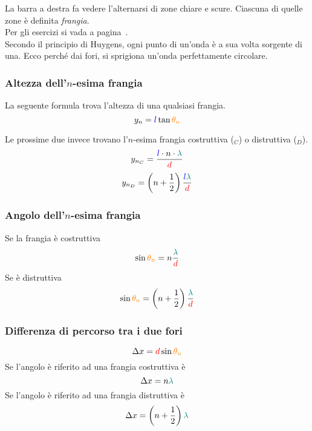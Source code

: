 La barra a destra fa vedere l'alternarsi di zone chiare e scure. Ciascuna di quelle zone è definita
\emph{frangia}.\\
Per gli esercizi si vada a pagina~\pageref{ex:young}.\\ [\baselineskip]
Secondo il principio di Huygens, ogni punto di un'onda è a sua volta sorgente di una. Ecco perché
dai fori, si sprigiona un'onda perfettamente circolare.

\subsubsection{Altezza dell'$n$-esima frangia}
La seguente formula trova l'altezza di una qualsiasi frangia.
\begin{equation*}
  y_n = \mathcolor{blue}{l}\tan\mathcolor{orange}{\theta_n}
\end{equation*}

Le prossime due invece trovano l'$n$-esima frangia costruttiva ($_C$) o distruttiva ($_D$).
\begin{equation*}
  y_{n_C} = \frac{\mathcolor{blue}{l}\cdot n\cdot\mathcolor{teal}{\lambda}}{\mathcolor{red}{d}}
\end{equation*}
\begin{equation*}
  y_{n_D} =
  \left(n+\frac{1}{2}\right)\frac{\mathcolor{blue}{l}\mathcolor{teal}{\lambda}}{\mathcolor{red}{d}}
\end{equation*}

\subsubsection{Angolo dell'$n$-esima frangia}
Se la frangia è costruttiva
\begin{equation*}
  \sin\mathcolor{orange}{\theta_n} = n\frac{\mathcolor{teal}{\lambda}}{\mathcolor{red}{d}}
\end{equation*}
Se è distruttiva
\begin{equation*}
  \sin\mathcolor{orange}{\theta_n} =
  \left(n+\frac{1}{2}\right)\frac{\mathcolor{teal}{\lambda}}{\mathcolor{red}{d}}
\end{equation*}

\subsubsection{Differenza di percorso tra i due fori}
\begin{equation*}
  \Delta x = \mathcolor{red}{d}\sin\mathcolor{orange}{\theta_n}
\end{equation*}
Se l'angolo è riferito ad una frangia costruttiva è 
\begin{equation*}
  \Delta x = n\mathcolor{teal}{\lambda}
\end{equation*}
Se l'angolo è riferito ad una frangia distruttiva è 
\begin{equation*}
  \Delta x = \left(n+\frac{1}{2}\right)\mathcolor{teal}{\lambda}
\end{equation*}

